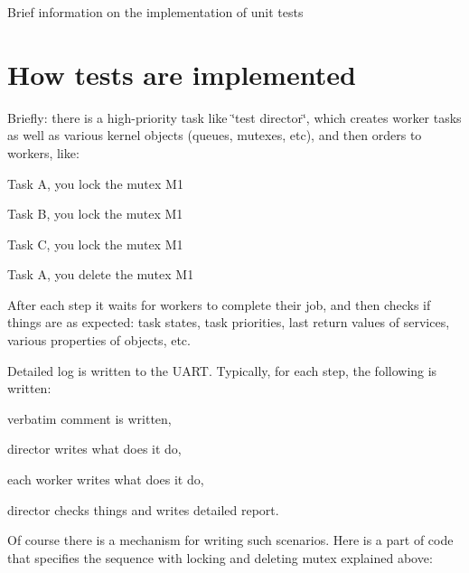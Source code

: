 Brief information on the implementation of unit tests\hypertarget{unit_tests_how_tests_are_implemented}{}\section{How tests are implemented}\label{unit_tests_how_tests_are_implemented}
Briefly\+: there is a high-\/priority task like \char`\"{}test director\char`\"{}, which creates worker tasks as well as various kernel objects (queues, mutexes, etc), and then orders to workers, like\+:


\begin{DoxyItemize}
\item Task A, you lock the mutex M1
\item Task B, you lock the mutex M1
\item Task C, you lock the mutex M1
\item Task A, you delete the mutex M1
\end{DoxyItemize}

After each step it waits for workers to complete their job, and then checks if things are as expected\+: task states, task priorities, last return values of services, various properties of objects, etc.

Detailed log is written to the U\+A\+R\+T. Typically, for each step, the following is written\+:


\begin{DoxyItemize}
\item verbatim comment is written,
\item director writes what does it do,
\item each worker writes what does it do,
\item director checks things and writes detailed report.
\end{DoxyItemize}

Of course there is a mechanism for writing such scenarios. Here is a part of code that specifies the sequence with locking and deleting mutex explained above\+:


